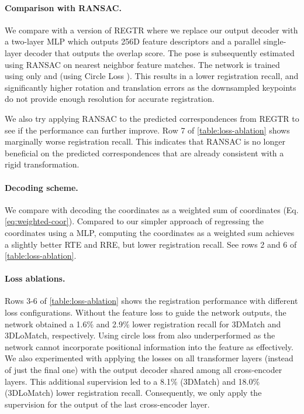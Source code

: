 \documentclass[10pt,twocolumn,letterpaper]{article}
\begin{document}
\vspace{-4mm}
\paragraph{Comparison with RANSAC.} We compare with a version of REGTR where we replace our output decoder with a two-layer MLP which outputs 256D feature descriptors and a parallel single-layer decoder that outputs the overlap score. The pose is subsequently estimated using RANSAC on nearest neighbor feature matches. The network is trained using only  and  (using Circle Loss \cite{sun2020circle}). This results in a lower registration recall, and significantly higher rotation and translation errors as the downsampled keypoints do not provide enough resolution for accurate registration.

We also try applying RANSAC to the predicted correspondences from REGTR to see if the performance can further improve. Row 7 of \cref{table:loss-ablation} shows marginally worse registration recall. This indicates that RANSAC is no longer beneficial on the predicted correspondences that are already consistent with a rigid transformation.

\vspace{-4mm}
\paragraph{Decoding scheme.}
We compare with decoding the coordinates as a weighted sum of coordinates (Eq. \ref{eq:weighted-coor}). Compared to our simpler approach of regressing the coordinates using a MLP, computing the coordinates as a weighted sum achieves a slightly better RTE and RRE, but lower registration recall. See rows 2 and 6 of \cref{table:loss-ablation}.

\vspace{-4mm}
\paragraph{Loss ablations.}
Rows 3-6 of \cref{table:loss-ablation} shows the registration performance with different loss configurations. Without the feature loss to guide the network outputs, the network obtained a 1.6\% and 2.9\% lower registration recall for 3DMatch and 3DLoMatch, respectively.
Using circle loss from \cite{huang2021predator} also underperformed as the network cannot incorporate positional information into the feature as effectively.
We also experimented with applying the losses on all  transformer layers (instead of just the final one) with the output decoder shared among all cross-encoder layers. This additional supervision led to a  8.1\% (3DMatch) and 18.0\% (3DLoMatch) lower registration recall. Consequently, we only apply the supervision for the output of the last cross-encoder layer.
\end{document}
